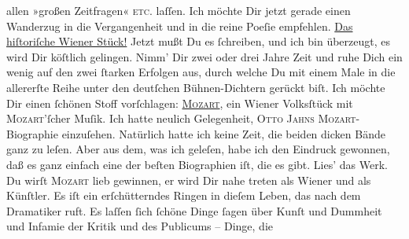                allen »großen Zeitfragen« \textsc{etc.} laſſen. Ich möchte Dir jetzt
               gerade einen \strikeout{\textcolor{gray}{×}\-\textcolor{gray}{×}\-\textcolor{gray}{×}\-\textcolor{gray}{×}\-\textcolor{gray}{×}\-\textcolor{gray}{×}\-\textcolor{gray}{×}\-\textcolor{gray}{×}} Wanderzug in die Vergangenheit und in die reine Poeſie empfehlen. \uline{Das hiſtoriſche Wiener
                  Stück!} Jetzt mußt Du es ſchreiben, und ich bin überzeugt, es wird Dir
               köſtlich gelingen. Nimm’ Dir zwei oder drei Jahre Zeit und ruhe Dich ein wenig auf
               den zwei ſtarken Erfolgen aus, durch welche Du mit einem {\pb}Male in die allererſte Reihe unter den deutſchen
               Bühnen-Dichtern gerückt biſt. Ich möchte Dir einen ſchönen Stoff vorſchlagen: \uline{\textsc{Mozart}}, ein Wiener Volksſtück mit \textsc{Mozart}’ſcher Muſik. Ich hatte neulich Gelegenheit, \textsc{Otto Jahns}{ }\textsc{Mozart}-Biographie einzuſehen. Natürlich hatte ich keine Zeit, die beiden
               dicken Bände ganz zu leſen.
               Aber aus dem, was ich geleſen, habe ich den Eindruck gewonnen, daß es ganz einfach
               eine der beſten Biographien iſt, die es gibt. Lies’ das Werk. Du wirſt \textsc{Mozart}{ }{\pb}lieb gewinnen, er wird Dir nahe treten als Wiener\strikeout{,}{ } und als Künſtler. Es iſt ein erſchütterndes
               Ringen in dieſem Leben, das nach dem Dramatiker ruft. Es laſſen ſich ſchöne Dinge
               ſagen über Kunſt und Dummheit und Infamie der Kritik und des Publicums – Dinge, die
